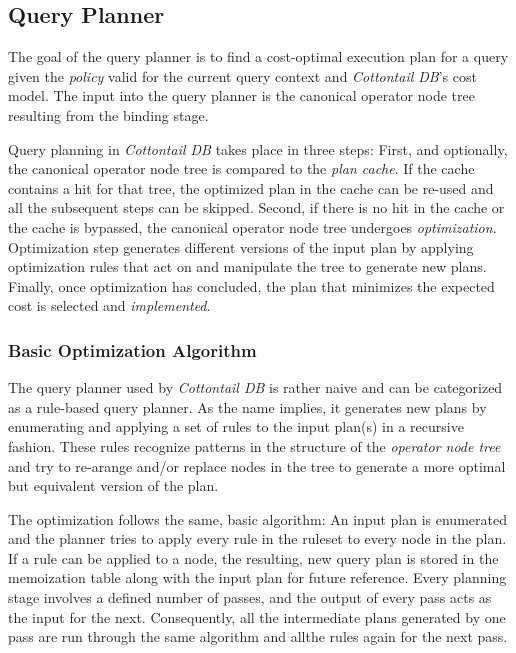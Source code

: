 \subsection{Query Planner}

The goal of the query planner is to find a cost-optimal execution plan for a query given the \emph{policy} valid for the current query context and \emph{Cottontail DB}'s cost model. The input into the query planner is the canonical operator node tree resulting from the binding stage.

Query planning in \emph{Cottontail DB} takes place in three steps: First, and optionally, the canonical operator node tree is compared to the \emph{plan cache}. If the cache contains a hit for that tree, the optimized plan in the cache can be re-used and all the subsequent steps can be skipped. Second, if there is no hit in the cache or the cache is bypassed, the canonical operator node tree undergoes \emph{optimization}. Optimization step generates different versions of the input plan by applying optimization rules that act on and manipulate the tree to generate new plans. Finally, once optimization has concluded, the  plan that minimizes the expected cost is selected and \emph{implemented}.

\subsubsection{Basic Optimization Algorithm}

The query planner used by \emph{Cottontail DB} is rather naive and can be categorized as a rule-based query planner. As the name implies, it generates new plans by enumerating and applying a set of rules to the input plan(s) in a recursive fashion. These rules recognize patterns in the structure of the \emph{operator node tree} and try to re-arange and/or replace nodes in the tree to generate a more optimal but equivalent version of the plan.

The optimization follows the same, basic algorithm: An input plan is enumerated and the planner tries to apply every rule in the ruleset to every node in the plan. If a rule can be applied to a node, the resulting, new query plan is stored in the memoization table along with the input plan for future reference. Every planning stage involves a defined number of passes, and the output of every pass acts as the input for the next. Consequently, all the intermediate plans generated by one pass are run through the same algorithm and allthe rules again for the next pass.

